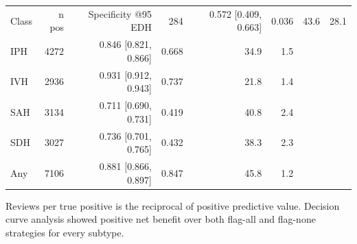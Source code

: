 \begin{tabular}{lrrrrr}
\toprule
Class & n pos & Specificity @95%
\midrule
EDH & 284 & 0.572 [0.409, 0.663] & 0.036 & 43.6 & 28.1 \\
IPH & 4272 & 0.846 [0.821, 0.866] & 0.668 & 34.9 & 1.5 \\
IVH & 2936 & 0.931 [0.912, 0.943] & 0.737 & 21.8 & 1.4 \\
SAH & 3134 & 0.711 [0.690, 0.731] & 0.419 & 40.8 & 2.4 \\
SDH & 3027 & 0.736 [0.701, 0.765] & 0.432 & 38.3 & 2.3 \\
Any & 7106 & 0.881 [0.866, 0.897] & 0.847 & 45.8 & 1.2 \\
\bottomrule
\end{tabular}

\vspace{2pt}
{\footnotesize Reviews per true positive is the reciprocal of positive predictive value. Decision curve analysis showed positive net benefit over both flag-all and flag-none strategies for every subtype.}
